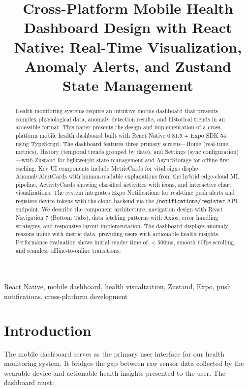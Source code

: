 \documentclass[conference]{IEEEtran}
\begin{document}
\title{Cross-Platform Mobile Health Dashboard Design with React Native: Real-Time Visualization, Anomaly Alerts, and Zustand State Management}

\author{
}

\maketitle

\begin{abstract}
Health monitoring systems require an intuitive mobile dashboard that presents complex physiological data, anomaly detection results, and historical trends in an accessible format. This paper presents the design and implementation of a cross-platform mobile health dashboard built with React Native 0.81.5 + Expo SDK 54 using TypeScript. The dashboard features three primary screens---Home (real-time metrics), History (temporal trends grouped by date), and Settings (sync configuration)---with Zustand for lightweight state management and AsyncStorage for offline-first caching. Key UI components include MetricCards for vital signs display, AnomalyAlertCards with human-readable explanations from the hybrid edge-cloud ML pipeline, ActivityCards showing classified activities with icons, and interactive chart visualizations. The system integrates Expo Notifications for real-time push alerts and registers device tokens with the cloud backend via the \texttt{/notifications/register} API endpoint. We describe the component architecture, navigation design with React Navigation 7 (Bottom Tabs), data fetching patterns with Axios, error handling strategies, and responsive layout implementation. The dashboard displays anomaly reasons inline with metric data, providing users with actionable health insights. Performance evaluation shows initial render time of $<$500ms, smooth 60fps scrolling, and seamless offline-to-online transitions.
\end{abstract}

\begin{IEEEkeywords}
React Native, mobile dashboard, health visualization, Zustand, Expo, push notifications, cross-platform development
\end{IEEEkeywords}

\section{Introduction}
The mobile dashboard serves as the primary user interface for our health monitoring system. It bridges the gap between raw sensor data collected by the wearable device and actionable health insights presented to the user. The dashboard must:
\end{document}
